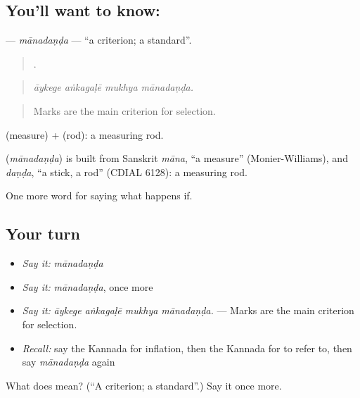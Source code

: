 \subsection*{You'll want to know: }
\textbf{} — \emph{mānadaṇḍa} — \textquotedblleft{}a criterion; a standard\textquotedblright{}.

\begin{quote}
   .
\end{quote}

\begin{quote}
\emph{āykege aṅkagaḷē mukhya mānadaṇḍa.}
\end{quote}

\begin{quote}
Marks are the main criterion for selection.
\end{quote}

 (measure) +  (rod): a measuring rod.

\begin{cousinweb}
\textbf{} (\emph{mānadaṇḍa}) is built from Sanskrit \emph{māna}, \textquotedblleft{}a measure\textquotedblright{} (Monier-Williams), and \emph{daṇḍa}, \textquotedblleft{}a stick, a rod\textquotedblright{} (CDIAL 6128): a measuring rod.
\end{cousinweb}

\begin{grammarlens}[title={What you've built}]
One more word for saying what happens if.
\end{grammarlens}

\subsection*{Your turn}
\begin{itemize}
\raggedright
  \item \emph{Say it:} \emph{mānadaṇḍa}
  \item \emph{Say it:} \emph{mānadaṇḍa}, once more
  \item \emph{Say it:} \emph{āykege aṅkagaḷē mukhya mānadaṇḍa.} — Marks are the main criterion for selection.
  \item \emph{Recall:} say the Kannada for inflation, then the Kannada for to refer to, then say \emph{mānadaṇḍa} again
\end{itemize}

\begin{tcolorbox}[breakable,colback=teal!4,colframe=teal!35!black,title={Before you move on}]
What does  mean? (\textquotedblleft{}A criterion; a standard\textquotedblright{}.) Say it once more.
\end{tcolorbox}
